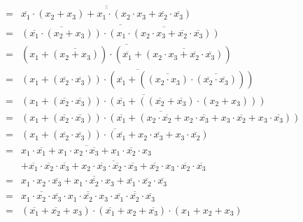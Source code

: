 \documentclass[DIN, pagenumber=false, fontsize=11pt, parskip=half]{scrartcl}
\begin{document}
\begin{enumerate}[label=(\alph*)]
\begin{eqnarray*}
                &=& \overline{\overline{\overline{x_1} \cdot (x_2 + x_3) + x_1 \cdot (x_2 \cdot x_3 + \overline{x_2} \cdot \overline{x_3})}}\\
                &=& \overline{\overline{(\overline{x_1} \cdot (x_2 + x_3))} \cdot \overline{(x_1 \cdot (x_2 \cdot x_3 + \overline{x_2} \cdot \overline{x_3}))}}\\
                &=& \overline{(x_1 + \overline{(x_2 + x_3)}) \cdot (\overline{x_1} + \overline{(x_2 \cdot x_3 + \overline{x_2} \cdot \overline{x_3})})}\\
                &=& \overline{(x_1 + (\overline{x_2} \cdot \overline{x_3})) \cdot (\overline{x_1} + (\overline{(x_2 \cdot x_3)} \cdot \overline{(\overline{x_2} \cdot \overline{x_3})}))}\\
                &=& \overline{(x_1 + (\overline{x_2} \cdot \overline{x_3})) \cdot (\overline{x_1} + ((\overline{x_2} + \overline{x_3}) \cdot (x_2 + x_3)))}\\
                &=& \overline{(x_1 + (\overline{x_2} \cdot \overline{x_3})) \cdot (\overline{x_1} + (x_2 \cdot \overline{x_2} + x_2 \cdot \overline{x_3} + x_3 \cdot \overline{x_2} + x_3 \cdot \overline{x_3}))}\\
                &=& \overline{(x_1 + (\overline{x_2} \cdot \overline{x_3})) \cdot (\overline{x_1} + x_2 \cdot \overline{x_3} + x_3 \cdot \overline{x_2})}\\
                &=& \overline{x_1 \cdot \overline{x_1} + x_1 \cdot x_2 \cdot \overline{x_3} + x_1 \cdot \overline{x_2} \cdot x_3} \\
                &&  \overline{+ \overline{x_1} \cdot \overline{x_2} \cdot \overline{x_3}
                    + x_2 \cdot \overline{x_3} \cdot \overline{x_2} \cdot \overline{x_3}
                    + \overline{x_2} \cdot x_3 \cdot \overline{x_2} \cdot \overline{x_3}}\\
                &=& \overline{x_1 \cdot x_2 \cdot \overline{x_3} + x_1 \cdot \overline{x_2} \cdot x_3 
                    + \overline{x_1} \cdot \overline{x_2} \cdot \overline{x_3}}\\
                &=& \overline{x_1 \cdot x_2 \cdot \overline{x_3}} \cdot \overline{x_1 \cdot \overline{x_2} \cdot x_3}
                    \cdot \overline{\overline{x_1} \cdot \overline{x_2} \cdot \overline{x_3}}\\
                &=& (\overline{x_1} + \overline{x_2} + x_3) \cdot (\overline{x_1} + x_2 + \overline{x_3})
                    \cdot (x_1 + x_2 + x_3)\\

\end{eqnarray*}
\end{enumerate}
\end{document}
